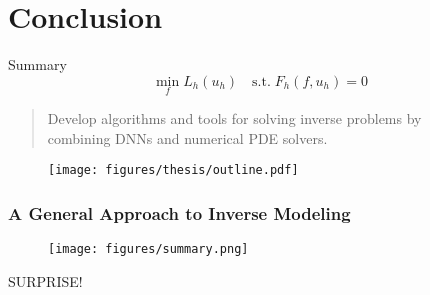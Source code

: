 \documentclass[usenames,dvipsnames]{beamer}
\newcommand{\cmark}{\ding{51}}%
\begin{document}
\section{Conclusion}

\begin{frame}{Summary}
	$$\min_{{f}} L_h(u_h) \quad \mathrm{s.t.}\; F_h({f}, u_h) = 0$$
	
	\begin{quote}
		\textcolor{green}{\cmark} Develop algorithms and tools for solving inverse problems by \\ combining DNNs and numerical PDE solvers. 
	\end{quote}
	
	
	\begin{figure}[hbt]
		\centering
		\texttt{[image: figures/thesis/outline.pdf]}
	\end{figure}
\end{frame}

\begin{frame}
	\frametitle{A General Approach to Inverse Modeling}
	\begin{figure}[hbt]
		\texttt{[image: figures/summary.png]}
	\end{figure}
\end{frame}

\begin{frame}
SURPRISE!
\end{frame}



\end{document}

